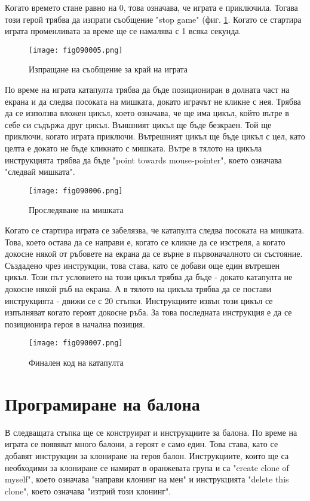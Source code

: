 Когато времето стане равно на 0, това означава, че играта е приключила. Тогава този герой трябва да изпрати съобщение "stop game" (фиг. \ref{fig090005}. Когато се стартира играта променливата за време ще се намалява с 1 всяка секунда.

\begin{figure}[H]
  \centering
  \texttt{[image: fig090005.png]}
  \caption{Изпращане на съобщение за край на играта}
\label{fig090005}
\end{figure}

По време на играта катапулта трябва да бъде позициониран в долната част на екрана и да следва посоката на мишката, докато играчът не кликне с нея. Трябва да се използва вложен цикъл, което означава, че ще има цикъл, който вътре в себе си съдържа друг цикъл. Външният цикъл ще бъде безкраен. Той ще приключи, когато играта приключи. Вътрешният цикъл ще бъде цикъл с цел, като целта е докато не бъде кликнато с мишката. Вътре в тялото на цикъла инструкцията трябва да бъде "point towards mouse-pointer", което означава "следвай мишката".
 
\begin{figure}[H]
  \centering
  \texttt{[image: fig090006.png]}
  \caption{Проследяване на мишката}
\label{fig090006}
\end{figure}

Когато се стартира играта се забелязва, че катапулта следва посоката на мишката. Това, което остава да се направи е, когато се кликне да се изстреля, а когато докосне някой от ръбовете на екрана да се върне в първоначалното си състояние. Създадено чрез инструкции, това става, като се добави още един вътрешен цикъл. Този път условието на този цикъл трябва да бъде - докато катапулта не докосне някой ръб на екрана. А в тялото на цикъла трябва да се постави инструкцията - движи се с 20 стъпки. Инструкциите извън този цикъл се изпълняват когато героят докосне ръба. За това последната инструкция е да се позиционира героя в начална позиция.

\begin{figure}[H]
  \centering
  \texttt{[image: fig090007.png]}
  \caption{Финален код на катапулта}
\label{fig090007}
\end{figure}

\section{Програмиране на балона}
В следващата стъпка ще се конструират и инструкциите за балона. По време на играта се появяват много балони, а героят е само един. Това става, като се добавят инструкции за клониране на героя балон. Инструкциите, които ще са необходими за клониране се намират в оранжевата група и са "create clone of myself", което означава "направи клонинг на мен" и инструкцията "delete this clone", което означава "изтрий този клонинг".

